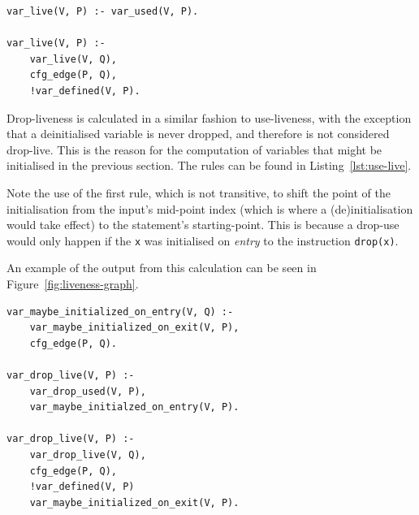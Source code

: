\documentclass[11pt,a4paper,twoside,openany]{report}
\newenvironment{sourcecode}{\captionsetup{type=listing}}{}
\newcommand{\InRust}[1]{\texttt{#1}}
\begin{document}
\begin{sourcecode}
  \label{lst:var-live}
\begin{verbatim}
var_live(V, P) :- var_used(V, P).

var_live(V, P) :-
    var_live(V, Q),
    cfg_edge(P, Q),
    !var_defined(V, P).
\end{verbatim}
\end{sourcecode}

Drop-liveness is calculated in a similar fashion to use-liveness, with the
exception that a deinitialised variable is never dropped, and therefore is not
considered drop-live. This is the reason for the computation of variables that
might be initialised in the previous section. The rules can be found in
Listing~\ref{lst:use-live}.

Note the use of the first rule, which is not transitive, to shift the point of
the initialisation from the input's mid-point index (which is where a
(de)initialisation would take effect) to the statement's starting-point. This is
because a drop-use would only happen if the \InRust{x} was initialised on
\textit{entry} to the instruction \InRust{drop(x)}.

An example of the output from this calculation can be seen in
Figure~\ref{fig:liveness-graph}.

\begin{sourcecode}
  \label{lst:use-live}
\begin{verbatim}
var_maybe_initialized_on_entry(V, Q) :-
    var_maybe_initialized_on_exit(V, P),
    cfg_edge(P, Q).

var_drop_live(V, P) :-
    var_drop_used(V, P),
    var_maybe_initialzed_on_entry(V, P).

var_drop_live(V, P) :-
    var_drop_live(V, Q),
    cfg_edge(P, Q),
    !var_defined(V, P)
    var_maybe_initialized_on_exit(V, P).
\end{verbatim}
\end{sourcecode}
\end{document}
